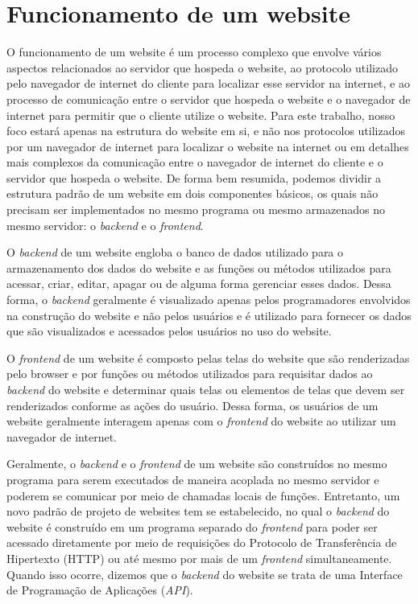 \section{Funcionamento de um website}

O funcionamento de um website é um processo complexo que envolve vários aspectos relacionados ao servidor que hospeda o website, ao protocolo utilizado pelo navegador de internet do cliente para localizar esse servidor na internet, e ao processo de comunicação entre o servidor que hospeda o website e o navegador de internet para permitir que o cliente utilize o website. Para este trabalho, nosso foco estará apenas na estrutura do website em si, e não nos protocolos utilizados por um navegador de internet para localizar o website na internet ou em detalhes mais complexos da comunicação entre o navegador de internet do cliente e o servidor que hospeda o website. De forma bem resumida, podemos dividir a estrutura padrão de um website em dois componentes básicos, os quais não precisam ser implementados no mesmo programa ou mesmo armazenados no mesmo servidor: o \textit{backend} e o \textit{frontend}.

O \textit{backend} de um website engloba o banco de dados utilizado para o armazenamento dos dados do website e as funções ou métodos utilizados para acessar, criar, editar, apagar ou de alguma forma gerenciar esses dados. Dessa forma, o \textit{backend} geralmente é visualizado apenas pelos programadores envolvidos na construção do website e não pelos usuários e é utilizado para fornecer os dados que são visualizados e acessados pelos usuários no uso do website.

O \textit{frontend} de um website é composto pelas telas do website que são renderizadas pelo browser e por funções ou métodos utilizados para requisitar dados ao \textit{backend} do website e determinar quais telas ou elementos de telas que devem ser renderizados conforme as ações do usuário. Dessa forma, os usuários de um website geralmente interagem apenas com o \textit{frontend} do website ao utilizar um navegador de internet.

Geralmente, o \textit{backend} e o \textit{frontend} de um website são construídos no mesmo programa para serem executados de maneira acoplada no mesmo servidor e poderem se comunicar por meio de chamadas locais de funções. Entretanto, um novo padrão de projeto de websites tem se estabelecido, no qual o \textit{backend} do website é construído em um programa separado do \textit{frontend} para poder ser acessado diretamente por meio de requisições do Protocolo de Transferência de Hipertexto (HTTP) ou até mesmo por mais de um \textit{frontend} simultaneamente. Quando isso ocorre, dizemos que o \textit{backend} do website se trata de uma Interface de Programação de Aplicações (\textit{API}).

